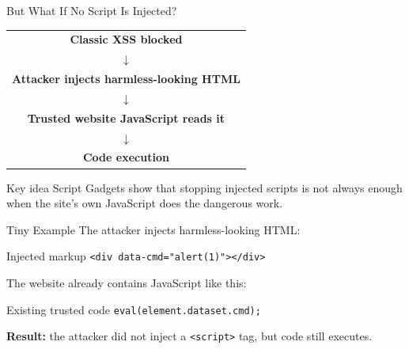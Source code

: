 \documentclass[%
font=nexus,
aspectratio=169,
language=english
]{tubsCD/tubscd}
\begin{document}
\begin{frame}{But What If No Script Is Injected?}
\begin{center}
\footnotesize
\setlength{\parskip}{0.2em}
\begin{tabular}{@{}c@{}}
\textbf{Classic XSS blocked} \\[0.2em]
$\downarrow$ \\[0.2em]
\textbf{Attacker injects harmless-looking HTML} \\[0.2em]
$\downarrow$ \\[0.2em]
\textbf{Trusted website JavaScript reads it} \\[0.2em]
$\downarrow$ \\[0.2em]
\textbf{Code execution} \\
\end{tabular}
\end{center}

\vspace{0.5em}

\begin{block}{Key idea}
Script Gadgets show that stopping injected scripts is not always enough when the site's own JavaScript does the dangerous work.
\end{block}
\end{frame}

\begin{frame}{Tiny Example}
The attacker injects harmless-looking HTML:

\vspace{0.4em}

\begin{exampleblock}{Injected markup}
\texttt{<div data-cmd="alert(1)"></div>}
\end{exampleblock}

\vspace{0.8em}

The website already contains JavaScript like this:

\vspace{0.4em}

\begin{exampleblock}{Existing trusted code}
\texttt{eval(element.dataset.cmd);}
\end{exampleblock}

\vspace{0.8em}

\textbf{Result:} the attacker did not inject a \texttt{<script>} tag, but code still executes.
\end{frame}
\end{document}

